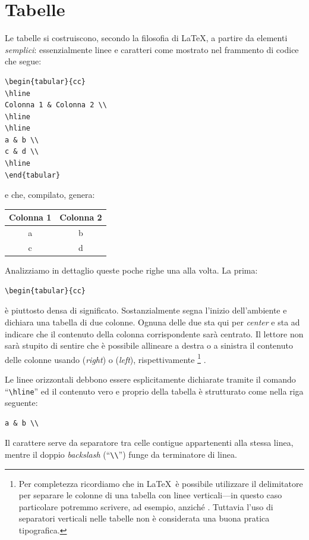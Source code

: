 \section{Tabelle}

Le tabelle si costruiscono, secondo la filosofia di \LaTeX, a partire da
elementi \emph{semplici}: essenzialmente linee e caratteri come
mostrato nel frammento di codice che segue:
\begin{verbatim}
\begin{tabular}{cc}
\hline
Colonna 1 & Colonna 2 \\
\hline
\hline
a & b \\
c & d \\
\hline
\end{tabular}
\end{verbatim}
e che, compilato, genera:

\vspace{0.5 cm}
\begin{tabular}{cc}
\hline
Colonna 1 & Colonna 2 \\
\hline
\hline
a & b \\
c & d \\
\hline
\end{tabular}
\vspace{0.5 cm}

\noindent Analizziamo in dettaglio queste poche righe una alla volta. La prima:
\begin{verbatim}
\begin{tabular}{cc}
\end{verbatim}
\`e piuttosto densa di significato. Sostanzialmente segna l'inizio
dell'ambiente  e dichiara una tabella di due colonne.
Ognuna delle due  sta qui per \emph{center} e sta ad indicare
che il contenuto della colonna corrispondente sar\`a centrato.
Il lettore non sar\`a stupito di sentire che \`e possibile allineare
a destra o a sinistra il contenuto delle colonne usando 
(\emph{right}) o  (\emph{left}), rispettivamente%
\footnote{Per completezza ricordiamo che in \LaTeX\ \`e possibile utilizzare
il delimitatore \cchar{|} per separare le colonne di una tabella con linee
verticali---in questo caso particolare potremmo scrivere, ad esempio,
 anzich\'e . Tuttavia l'uso di separatori verticali
nelle tabelle non \`e considerata una buona pratica tipografica.}%
.

Le linee orizzontali debbono essere esplicitamente dichiarate tramite il
comando ``\verb|\hline|'' ed il contenuto vero e proprio della tabella \`e
strutturato come nella riga seguente:
\begin{verbatim}
a & b \\
\end{verbatim}
Il carattere \cchar{\&} serve da separatore tra celle contigue appartenenti
alla stessa linea, mentre il doppio \emph{backslash} (``\verb|\\|'') funge da
terminatore di linea.

